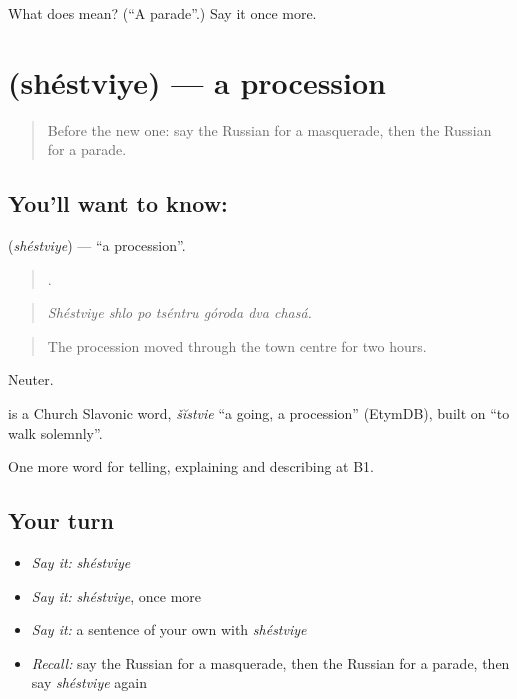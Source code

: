 \begin{tcolorbox}[breakable,colback=teal!4,colframe=teal!35!black,title={Before you move on}]
What does  mean? (\textquotedblleft{}A parade\textquotedblright{}.) Say it once more.
\end{tcolorbox}
\section[\texorpdfstring{\ru{шествие} (shéstviye)}{шествие (shéstviye)}]{ (shéstviye) — a procession}

\label{lesson:RU-C316-shestviye}



\begin{quote}
Before the new one: say the Russian for a masquerade, then the Russian for a parade.
\end{quote}

\subsection*{You'll want to know: }
\textbf{} (\emph{shéstviye}) — \textquotedblleft{}a procession\textquotedblright{}.

\begin{quote}
      .
\end{quote}

\begin{quote}
\emph{Shéstviye shlo po tséntru góroda dva chasá.}
\end{quote}

\begin{quote}
The procession moved through the town centre for two hours.
\end{quote}

Neuter.

\begin{cousinweb}
\emph{} is a Church Slavonic word, \emph{šĭstvie} \textquotedblleft{}a going, a procession\textquotedblright{} (EtymDB), built on \emph{} \textquotedblleft{}to walk solemnly\textquotedblright{}.
\end{cousinweb}

\begin{grammarlens}[title={What you've built}]
One more word for telling, explaining and describing at B1.
\end{grammarlens}

\subsection*{Your turn}
\begin{itemize}
\raggedright
  \item \emph{Say it:} \emph{shéstviye}
  \item \emph{Say it:} \emph{shéstviye}, once more
  \item \emph{Say it:} a sentence of your own with \emph{shéstviye}
  \item \emph{Recall:} say the Russian for a masquerade, then the Russian for a parade, then say \emph{shéstviye} again
\end{itemize}

